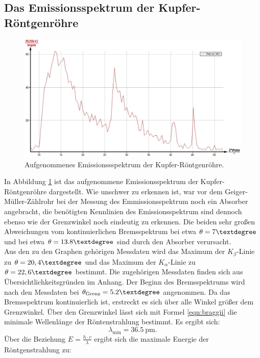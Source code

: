 \FloatBarrier
\subsection{Das Emissionsspektrum der Kupfer-Röntgenröhre}
\begin{figure}
	\centering
	\includegraphics[width=1.0\textwidth]{nIKO_und_jULIAN_ÜLADS/Kupfaemmision.jpg}
	\caption{Aufgenommenes Emissionssspektrum der Kupfer-Röntgenröhre.}
	\label{fig:emissionlol}
\end{figure}
In Abbildung \ref{fig:emissionlol} ist das aufgenommene Emissionsspektrum der Kupfer-Röntgenröhre dargestellt.
Wie unschwer zu erkennen ist, war vor dem Geiger-Müller-Zählrohr bei der Messung des Emmissionsspektrum noch ein Absorber angebracht, die benötigten Kennlinien des Emissionsspektrum sind dennoch ebenso wie der Grenzwinkel noch eindeutig zu erkennen.
Die beiden sehr großen Abweichungen vom kontinuierlichen Bremsspektrum bei etwa $\theta=7\textdegree$ und bei etwa $\theta=13.8\textdegree$ sind durch den Absorber verursacht.\\
Aus den zu den Graphen gehörigen Messdaten wird das Maximum der $K_\beta$-Linie zu
$\theta=20,4\textdegree$ und das Maximum der $K_\alpha$-Linie zu $\theta=22,6\textdegree$ bestimmt. Die zugehörigen Messdaten finden sich aus Übersichtlichkeitsgründen im Anhang.
Der Beginn des Bremsspektrums wird nach den Messdaten bei $\theta_\mathrm{Grenz}=5.2\textdegree$ angenommen. Da das Bremsspektrum kontinuierlich ist, erstreckt es sich über alle Winkel größer dem Grenzwinkel.
Über den Grenzwinkel lässt sich mit Formel \eqref{eqn:braggii} die minimale Wellenlänge der Röntenstrahlung bestimmt.
Es ergibt sich:
\begin{equation*}
	 \lambda_\mathrm{min}=\SI{36.5}{\pico\meter} \text{.}
\end{equation*}
Über die Beziehung $E=\frac{h\cdot c}{\lambda}$ ergibt sich die maximale Energie der Röntgenstrahlung zu:
